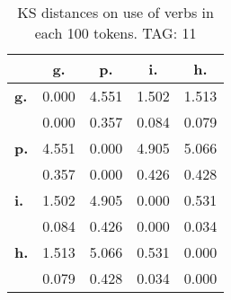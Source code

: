 \begin{table}[h!]
\begin{center}
\begin{tabular}{| l || c | c | c | c |}\hline
 & {\bf g.} & {\bf p.} & {\bf i.} & {\bf h.} \\\hline\hline
{\bf g.} & 0.000 & 4.551 & 1.502 & 1.513 \\
{\bf } & 0.000 & 0.357 & 0.084 & 0.079 \\\hline
{\bf p.} & 4.551 & 0.000 & 4.905 & 5.066 \\
{\bf } & 0.357 & 0.000 & 0.426 & 0.428 \\\hline
{\bf i.} & 1.502 & 4.905 & 0.000 & 0.531 \\
{\bf } & 0.084 & 0.426 & 0.000 & 0.034 \\\hline
{\bf h.} & 1.513 & 5.066 & 0.531 & 0.000 \\
{\bf } & 0.079 & 0.428 & 0.034 & 0.000 \\\hline
\end{tabular}
\caption{KS distances on use of verbs in each 100 tokens. TAG: 11}
\end{center}
\end{table}